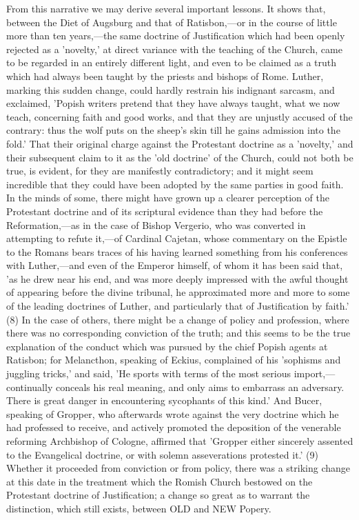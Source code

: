 \documentclass[
]{book}
\begin{document}
From this narrative we may derive several important lessons. It shows that, between the Diet of Augsburg and that of Ratisbon,---or in the course of little more than ten years,---the same doctrine of Justification which had been openly rejected as a 'novelty,' at direct variance with the teaching of the Church, came to be regarded in an entirely different light, and even to be claimed as a truth which had always been taught by the priests and bishops of Rome. Luther, marking this sudden change, could hardly restrain his indignant sarcasm, and exclaimed, 'Popish writers pretend that they have always taught, what we now teach, concerning faith and good works, and that they are unjustly accused of the contrary: thus the wolf puts on the sheep's skin till he gains admission into the fold.' That their original charge against the Protestant doctrine as a 'novelty,' and their subsequent claim to it as the 'old doctrine' of the Church, could not both be true, is evident, for they are manifestly contradictory; and it might seem incredible that they could have been adopted by the same parties in good faith. In the minds of some, there might have grown up a clearer perception of the Protestant doctrine and of its scriptural evidence than they had before the Reformation,---as in the case of Bishop Vergerio, who was converted in attempting to refute it,---of Cardinal Cajetan, whose commentary on the Epistle to the Romans bears traces of his having learned something from his conferences with Luther,---and even of the Emperor himself, of whom it has been said that, 'as he drew near his end, and was more deeply impressed with the awful thought of appearing before the divine tribunal, he approximated more and more to some of the leading doctrines of Luther, and particularly that of Justification by faith.' (8) In the case of others, there might be a change of policy and profession, where there was no corresponding conviction of the truth; and this seems to be the true explanation of the conduct which was pursued by the chief Popish agents at Ratisbon; for Melancthon, speaking of Eckius, complained of his 'sophisms and juggling tricks,' and said, 'He sports with terms of the most serious import,---continually conceals his real meaning, and only aims to embarrass an adversary. There is great danger in encountering sycophants of this kind.' And Bucer, speaking of Gropper, who afterwards wrote against the very doctrine which he had professed to receive, and actively promoted the deposition of the venerable reforming Archbishop of Cologne, affirmed that 'Gropper either sincerely assented to the Evangelical doctrine, or with solemn asseverations protested it.' (9) Whether it proceeded from conviction or from policy, there was a striking change at this date in the treatment which the Romish Church bestowed on the Protestant doctrine of Justification; a change so great as to warrant the distinction, which still exists, between OLD and NEW Popery.
\end{document}

